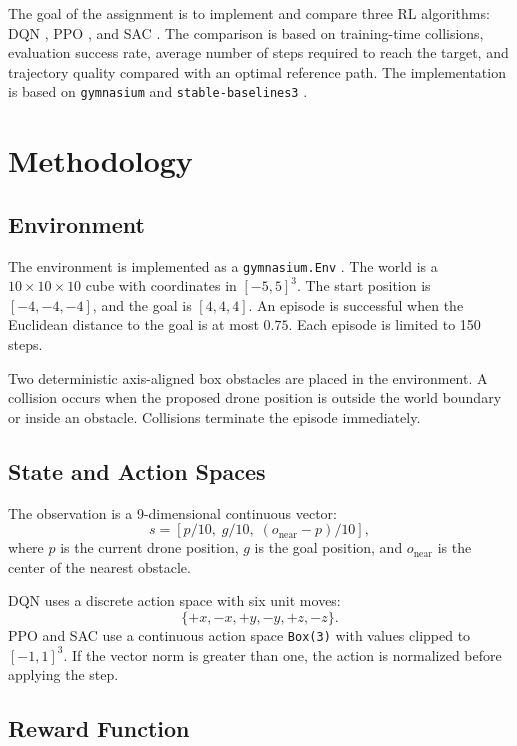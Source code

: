 \documentclass[conference]{IEEEtran}
\begin{document}
The goal of the assignment is to implement and compare three RL algorithms:
DQN \cite{mnih2015dqn}, PPO \cite{schulman2017ppo}, and SAC
\cite{haarnoja2018sac}. The comparison is based on training-time collisions,
evaluation success rate, average number of steps required to reach the target,
and trajectory quality compared with an optimal reference path. The
implementation is based on \texttt{gymnasium} \cite{gymnasium} and
\texttt{stable-baselines3} \cite{stablebaselines3}.

\section{Methodology}

\subsection{Environment}

The environment is implemented as a \texttt{gymnasium.Env} \cite{gymnasium}.
The world is a $10 \times 10 \times 10$ cube with coordinates in $[-5, 5]^3$.
The start position is $[-4, -4, -4]$, and the goal is $[4, 4, 4]$. An episode
is successful when the Euclidean distance to the goal is at most $0.75$. Each
episode is limited to 150 steps.

Two deterministic axis-aligned box obstacles are placed in the environment.
A collision occurs when the proposed drone position is outside the world
boundary or inside an obstacle. Collisions terminate the episode immediately.

\subsection{State and Action Spaces}

The observation is a 9-dimensional continuous vector:
\begin{equation}
s = [p / 10,\; g / 10,\; (o_{\mathrm{near}} - p) / 10],
\end{equation}
where $p$ is the current drone position, $g$ is the goal position, and
$o_{\mathrm{near}}$ is the center of the nearest obstacle.

DQN uses a discrete action space with six unit moves:
\[
\{+x, -x, +y, -y, +z, -z\}.
\]
PPO and SAC use a continuous action space \texttt{Box(3)} with values clipped
to $[-1, 1]^3$. If the vector norm is greater than one, the action is
normalized before applying the step.

\subsection{Reward Function}
\end{document}
